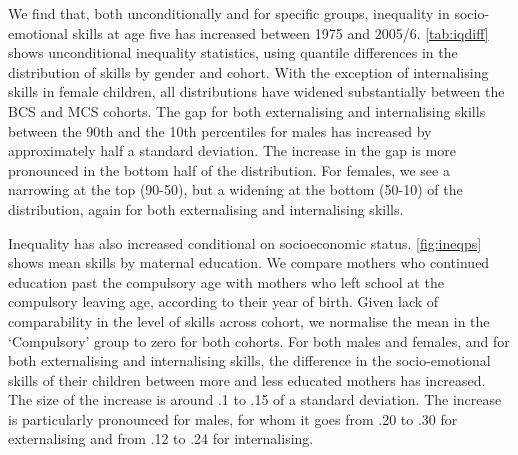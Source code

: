 We find that, both unconditionally and for specific groups, inequality in socio-emotional skills at age five has increased between 1975 and 2005/6. \autoref{tab:iqdiff} shows unconditional inequality statistics, using quantile differences in the distribution of skills by gender and cohort. With the exception of internalising skills in female children, all distributions have widened substantially between the BCS and MCS cohorts. The gap for both externalising and internalising skills between the 90th and the 10th percentiles for males has increased by approximately half a standard deviation. The increase in the gap is more pronounced in the bottom half of the distribution. For females, we see a narrowing at the top (90-50), but a widening at the bottom (50-10) of the distribution, again for both externalising and internalising skills.

Inequality has also increased conditional on socioeconomic status. \autoref{fig:ineqps} shows mean skills by maternal education. We compare mothers who continued education past the compulsory age with mothers who left school at the compulsory leaving age, according to their year of birth. Given lack of comparability in the level of skills across cohort, we normalise the mean in the `Compulsory' group to zero for both cohorts. For both males and females, and for both externalising and internalising skills, the difference in the socio-emotional skills of their children between more and less educated mothers has increased. The size of the increase is around .1 to .15 of a standard deviation. The increase is particularly pronounced for males, for whom it goes from .20 to .30 for externalising and from .12 to .24 for internalising.

